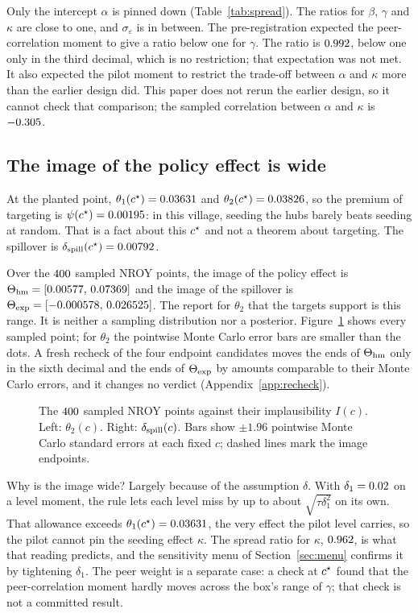 Only the intercept $\alpha$ is pinned down (Table~\ref{tab:spread}). The ratios for
$\beta$, $\gamma$ and $\kappa$ are close to one, and $\sigma_\varepsilon$ is in
between. The pre-registration expected the peer-correlation moment to give a ratio
below one for $\gamma$. The ratio is $0.992$, below one only in the
third decimal, which is no restriction; that expectation was not met. It also
expected the pilot moment to restrict the trade-off between $\alpha$ and $\kappa$
more than the earlier design did. This paper does not rerun the earlier design,
so it cannot check that comparison; the sampled correlation between $\alpha$ and
$\kappa$ is $-0.305$.

\subsection{The image of the policy effect is wide}\label{sec:image}

At the planted point, $\theta_1(c^\star)=0.03631$ and
$\theta_2(c^\star)=0.03826$, so the premium of targeting is
$\psi(c^\star)=0.00195$: in this village, seeding the hubs barely beats
seeding at random. That is a fact about this $c^\star$ and not a theorem about
targeting. The spillover is $\delta_{\mathrm{spill}}(c^\star)=0.00792$.

Over the $400$ sampled NROY points, the image of the policy effect is
$\Theta_{\mathrm{hm}}=[0.00577,\,0.07369]$ and the image of the spillover is
$\Theta_{\mathrm{exp}}=[-0.000578,\,0.026525]$. The report for $\theta_2$ that
the targets support is this range. It is neither a sampling distribution nor a
posterior. Figure~\ref{fig:points} shows every sampled point; for $\theta_2$ the
pointwise Monte Carlo error bars are smaller than the dots. A fresh recheck of
the four endpoint candidates moves the ends of $\Theta_{\mathrm{hm}}$ only in the sixth
decimal and the ends of $\Theta_{\mathrm{exp}}$ by amounts comparable to their Monte
Carlo errors, and it changes no verdict (Appendix~\ref{app:recheck}).

\begin{figure}[t]
\centering
{}
\caption{The $400$ sampled NROY points against their implausibility
$I(c)$. Left: $\theta_2(c)$. Right: $\delta_{\mathrm{spill}}(c)$. Bars show $\pm1.96$ pointwise
Monte Carlo standard errors at each fixed $c$; dashed lines mark the image
endpoints.}
\label{fig:points}
\end{figure}

Why is the image wide? Largely because of the assumption $\delta$. With
$\delta_1=0.02$ on a level moment, the rule lets each level miss by up to
about $\sqrt{\tau\delta_1^2}$ on its own. That allowance exceeds
$\theta_1(c^\star)=0.03631$, the very effect the pilot level carries, so the
pilot cannot pin the seeding effect $\kappa$. The spread ratio for $\kappa$,
$0.962$, is what that reading predicts, and the sensitivity menu of
Section~\ref{sec:menu} confirms it by tightening $\delta_1$. The peer weight is a
separate case: a check at $c^\star$ found that the peer-correlation moment hardly
moves across the box's range of $\gamma$; that check is not a committed result.

